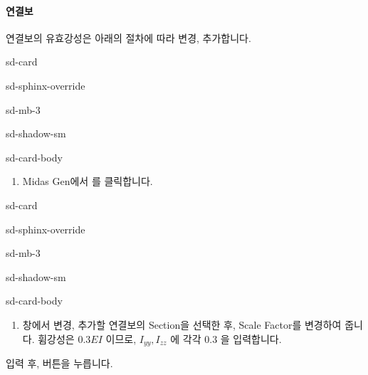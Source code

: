 \documentclass[a4paper,10pt,korean]{sphinxmanual}
\begin{document}
\paragraph{연결보}
\label{\detokenize{1_stiffness_setting:id3}}
\sphinxAtStartPar
연결보의 유효강성은 아래의 절차에 따라 변경, 추가합니다.

\begin{sphinxuseclass}{sd-card}
\begin{sphinxuseclass}{sd-sphinx-override}
\begin{sphinxuseclass}{sd-mb-3}
\begin{sphinxuseclass}{sd-shadow-sm}
\begin{sphinxuseclass}{sd-card-body}\begin{enumerate}
%
\item {} 
\sphinxAtStartPar
Midas Gen에서  \sphinxhyphen{}  \sphinxhyphen{}  를 클릭합니다.

\end{enumerate}

\end{sphinxuseclass}
\end{sphinxuseclass}
\end{sphinxuseclass}
\end{sphinxuseclass}
\end{sphinxuseclass}
\begin{sphinxuseclass}{sd-card}
\begin{sphinxuseclass}{sd-sphinx-override}
\begin{sphinxuseclass}{sd-mb-3}
\begin{sphinxuseclass}{sd-shadow-sm}
\begin{sphinxuseclass}{sd-card-body}\begin{enumerate}
%
\setcounter{enumi}{1}
\item {} 
\sphinxAtStartPar
{} 창에서 변경, 추가할 연결보의 Section을 선택한 후, Scale Factor를 변경하여 줍니다.
휨강성은 \(0.3EI\) 이므로, \(I_{yy}, I_{zz}\) 에 각각 \(0.3\) 을 입력합니다.

\end{enumerate}

\begin{figure}[htbp]
\centering

\noindent{}
\end{figure}

\sphinxAtStartPar
입력 후,  버튼을 누릅니다.

\end{sphinxuseclass}
\end{sphinxuseclass}
\end{sphinxuseclass}
\end{sphinxuseclass}
\end{sphinxuseclass}
\end{document}
